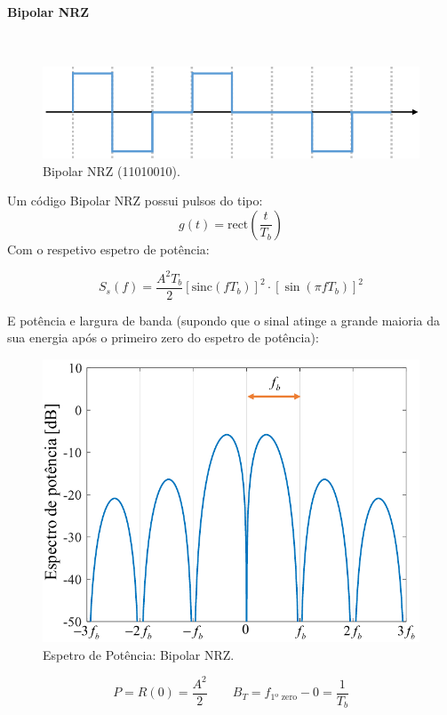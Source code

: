 \clearpage
\paragraph*{Bipolar NRZ}\mbox{}\\
\label{line:bipolarNRZ}
\begin{figure}[H]
    \centering
    \includegraphics[width = 0.8\linewidth]{img/digital/line-codes/LBipolarNRZ.png}
    \caption{Bipolar NRZ (11010010).}
    \label{fig:bipolarNRZ}
\end{figure}
\noindent Um código Bipolar NRZ possui pulsos do tipo:
$$
    g(t) = \text{rect}\left(\frac{t}{T_b}\right)
$$
\noindent Com o respetivo espetro de potência:

$$
    \boxed{ S_s(f) = \frac{A^2 T_b}{2} \left[\text{sinc}(f T_b)\right]^2 \cdot \left[\sin(\pi f T_b)\right]^2 }
$$

\noindent E potência e largura de banda (supondo que o sinal atinge a grande maioria da sua energia após o primeiro zero do espetro de potência):

\begin{figure}[H]
    \centering
    \includegraphics[width = 0.7\linewidth]{img/digital/line-codes/PBipolarNRZ.png}
    \caption{Espetro de Potência: Bipolar NRZ.}
    \label{fig:PBipolarNRZ}
\end{figure}

$$
    \boxed{P = R(0) = \frac{A^2}{2}}\qquad
    \boxed{B_T = f_{\text{1º zero}} - 0 = \frac{1}{T_b}}
$$

